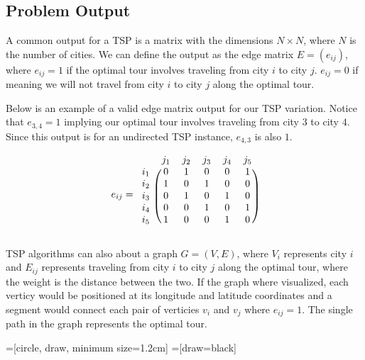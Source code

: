 \documentclass[11pt,fleqn]{article}
\begin{document}
\subsection{Problem Output}
A common output for a TSP is a matrix with the dimensions $N\times N$, where
$N$ is the number of cities.  We can define the output as the edge matrix
$E = (e_{ij})$, where $e_{ij}=1$ if the optimal tour involves
traveling from city $i$ to city $j$.  $e_{ij}=0$ if meaning we will not
travel from city $i$ to city $j$ along the optimal tour.
\par

Below is an example of a valid edge matrix output for our TSP variation.
Notice that $e_{3,4}=1$ implying our optimal tour involves traveling from
city $3$ to city $4$.  Since this output is for an undirected TSP instance,
$e_{4,3}$ is also $1$.
\par

\begin{align*}
  e_{ij}=
  \begin{blockarray}{cccccc}
    & j_1 & j_2 & j_3 & j_4 & j_5 \\
  \begin{block}{c(ccccc)}
    i_1 & 0 & 1 & 0 & 0 & 1 \\
    i_2 & 1 & 0 & 1 & 0 & 0 \\
    i_3 & 0 & 1 & 0 & 1 & 0 \\
    i_4 & 0 & 0 & 1 & 0 & 1 \\
    i_5 & 1 & 0 & 0 & 1 & 0 \\
  \end{block}
  \end{blockarray}
\end{align*}

TSP algorithms can also about a graph $G=(V,E)$, where $V_i$
represents city $i$ and $E_{ij}$ represents traveling from city $i$ to
city $j$ along the optimal tour, where the weight is the distance between
the two.  If the graph where visualized, each verticy would be positioned
at its longitude and latitude coordinates and a segment would connect each pair
of verticies $v_i$ and $v_j$ where $e_{ij}=1$.  The single path in the graph
represents the optimal tour.
\par

=[circle, draw, minimum size=1.2cm]
=[draw=black]
\end{document}
